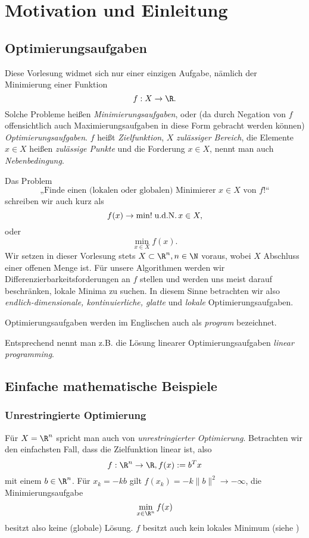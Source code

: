 \chapter{Motivation und Einleitung}


\section{Optimierungsaufgaben}

Diese Vorlesung widmet sich nur einer einzigen Aufgabe, nämlich der Minimierung einer Funktion
\[
	f : X \to \R.
\]
Solche Probleme heißen \emph{Minimierungsaufgaben}, oder (da durch Negation von $f$ offensichtlich auch Maximierungsaufgaben in diese Form gebracht werden können) \emph{Optimierungsaufgaben}.
$f$ heißt \emph{Zielfunktion}, $X$ \emph{zulässiger Bereich}, die Elemente $x \in X$ heißen \emph{zulässige Punkte} und die Forderung $x \in X$, nennt man auch \emph{Nebenbedingung}.

Das Problem
\[
	\text{„Finde einen (lokalen oder globalen) Minimierer $x\in X$ von $f$!“}
\]
schreiben wir auch kurz als
\[
	f(x) \to \min!
	\;\text{u.d.N.}\,
	x \in X,
\]
oder
\[
	\min_{x\in X} f(x).
\]
Wir setzen in dieser Vorlesung stets $X \subset \R^n, n \in \N$ voraus, wobei $X$ Abschluss einer offenen Menge ist.
Für unsere Algorithmen werden wir Differenzierbarkeitsforderungen an $f$ stellen und werden uns meist darauf beschränken, lokale Minima zu suchen.
In diesem Sinne betrachten wir also \emph{endlich-dimensionale, kontinuierliche, glatte} und \emph{lokale} Optimierungsaufgaben.

Optimierungsaufgaben werden im Englischen auch als \emph{program} bezeichnet.

Entsprechend nennt man z.B. die Lösung linearer Optimierungsaufgaben \emph{linear programming}.


\section{Einfache mathematische Beispiele}


\subsection{Unrestringierte Optimierung}

Für $X = \R^n$ spricht man auch von \emph{unrestringierter Optimierung}.
Betrachten wir den einfachsten Fall, dass die Zielfunktion linear ist, also
\[
	f : \R^n \to \R,
	f(x) := b^T x
\]
mit einem $b \in \R^n$.
Für $x_k = -kb$ gilt $f(x_k) = -k\|b\|^2 \to -\infty$, die Minimierungsaufgabe
\[
	\min_{x\in\R^n} f(x)
\]
besitzt also keine (globale) Lösung.
$f$ besitzt auch kein lokales Minimum (siehe )

